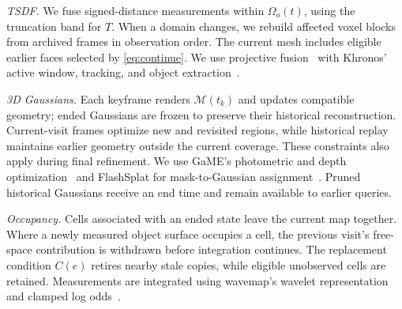 \emph{TSDF.} We fuse signed-distance measurements within $\Omega_o(t)$, using the truncation band for $T$.
When a domain changes, we rebuild affected voxel blocks from archived frames in observation order.
The current mesh includes eligible earlier faces selected by \cref{eq:continue}. We use projective
fusion~\cite{curless1996volumetric,newcombe2011kinectfusion} with Khronos' active window, tracking, and
object extraction~\cite{schmid2024khronos}.

\emph{3D Gaussians.} Each keyframe renders $\mathcal{M}(t_k)$ and updates compatible geometry;
ended Gaussians are frozen to preserve their historical reconstruction. Current-visit frames optimize
new and revisited regions, while historical replay maintains earlier geometry outside the current
coverage. These constraints also apply during final refinement. We use GaME's photometric and depth
optimization~\cite{yugay2026game,kerbl2023gaussians} and FlashSplat for mask-to-Gaussian
assignment~\cite{shen2024flashsplat}. Pruned historical Gaussians receive an end time and remain
available to earlier queries.

\emph{Occupancy.} Cells associated with an ended state leave the current map together. Where a newly
measured object surface occupies a cell, the previous visit's free-space contribution is withdrawn
before integration continues. The replacement condition $C(e)$ retires nearby stale copies, while
eligible unobserved cells are retained. Measurements are integrated using wavemap's wavelet
representation and clamped log odds~\cite{reijgwart2023wavemap,hornung2013octomap}.
